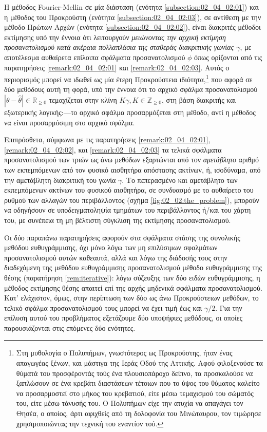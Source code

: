 Η μέθοδος Fourier-Mellin σε μία διάσταση (ενότητα \ref{subsection:02_04_02:01})
και η μέθοδος του Προκρούστη (ενότητα \ref{subsection:02_04_02:03}), σε
αντίθεση με την μέθοδο Πρώτων Αρχών (ενότητα \ref{subsection:02_04_02:02}),
είναι διακριτές μέθοδοι εκτίμησης υπό την έννοια ότι λειτουργούν
\textit{μειώνοντας την αρχική εκτίμηση προσανατολισμού κατά ακέραια πολλαπλάσια
της σταθεράς διακριτικής γωνίας $\gamma$}, με αποτέλεσμα αυθαίρετα επίλοιπα
σφάλματα προσανατολισμού $\phi$ όπως ορίζονται από τις παρατηρήσεις
\ref{remark:02_04_02:01} και \ref{remark:02_04_02:03}. Αυτός ο περιορισμός
μπορεί να ιδωθεί ως μία έτερη Προκρούστεια ιδιότητα,\footnote{Στη μυθολογία ο
Πολυπήμων, γνωστότερος ως Προκρούστης, ήταν ένας απαγωγέας ξένων, και μάστιγα
της Ιεράς Οδού της Αττικής. Αφού φιλοξενούσε τα θύματά του προσφέροντάς τούς
ένα πλουσιοπάροχο δείπνο, τα προσκαλούσε να ξαπλώσουν σε ένα κρεβάτι διαστάσεων
τέτοιων που το ύψος του θύματος καλείτο να προσαρμοστεί στο μήκος του
κρεβατιού, είτε μέσω τεμαχισμού του σώματός του, είτε μέσω τάνυσής του. Ο
Πολυπήμων είχε την ατυχία να απαγάγει τον Θησέα, ο οποίος, άρτι αφιχθείς από τη
δολοφονία του Μινώταυρου, τον τιμώρησε χρησιμοποιώντας την τεχνική του εναντίον
τού.} που αφορά σε δύο μεθόδους αυτή τη φορά, υπό την έννοια ότι το αρχικό
σφάλμα προσανατολισμού $|\theta - \hat{\theta}| \in \mathbb{R}_{\geq 0}$
τεμαχίζεται στην κλίνη $K\gamma, K \in \mathbb{Z}_{\geq 0}$, στη βάση διακριτής
και εξωτερικής λογικής:---το αρχικό σφάλμα προσαρμόζεται στη μέθοδο, αντί η
μέθοδος να είναι προσαρμόσιμη στο αρχικό σφάλμα.

Επιπρόσθετα, σύμφωνα με τις παρατηρήσεις \ref{remark:02_04_02:01},
\ref{remark:02_04_02:02}, και \ref{remark:02_04_02:03} τα τελικά σφάλματα
προσανατολισμού των τριών ως άνω μεθόδων εξαρτώνται από τον \textit{αμετάβλητο}
αριθμό των εκπεμπόμενων από τον φυσικό αισθητήρα απόστασης ακτίνων, ή,
ισοδύναμα, από την αμετάβλητη διακριτική του γωνία $\gamma$. Το πεπερασμένο και
αμετάβλητο των εκπεμπόμενων ακτίνων του φυσικού αισθητήρα, σε συνδυασμό με το
αυθαίρετο του ρυθμού των αλλαγών του περιβάλλοντος (σχήμα
\ref{fig:02_02:the_problem}), μπορούν να οδηγήσουν σε υποδειγματοληψία τμημάτων
του περιβάλλοντος ή/και του χάρτη του, με συνέπεια τη μη βέλτιστη σύγκλιση της
εκτίμησης προσανατολισμού.

Οι δύο παραπάνω παρατηρήσεις αφορούν στα σφάλματα στάσης της συνολικής μεθόδου
ευθυγράμμισης, όχι μόνο λόγω των μη επιλύσιμων σφαλμάτων προσανατολισμού αυτών
καθεαυτά, αλλά και λόγω της διάδοσής τους στην διαδεχόμενη της μεθόδου
ευθυγράμμισης προσανατολισμού μέθοδο ευθυγράμμισης της θέσης (παρατήρηση
\ref{rem:iterative}): λόγω σύζευξης των δύο ειδών ευθυγράμμισης, η μέθοδος
εκτίμησης θέσης απαιτεί επί της αρχής μηδενικά σφάλματα προσανατολισμού. Κατ'
ελάχιστον, όμως, στην περίπτωση των δύο ως άνω Προκρούστειων μεθόδων, το τελικό
σφάλμα προσανατολισμού τους μπορεί να έχει τιμή έως και $\gamma/2$. Για την
επίλυση αυτού του προβλήματος εξετάζουμε δύο υποψήφιες μεθόδους, οι οποίες
παρουσιάζονται στις επόμενες δύο ενότητες.


